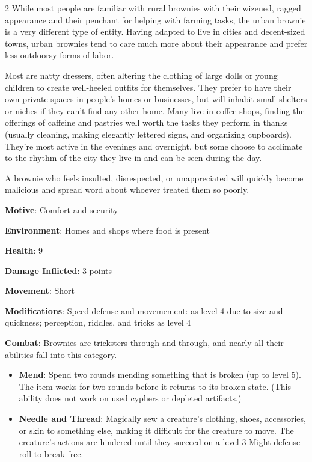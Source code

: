 \begin{multicols}{2}
While most people are familiar with rural brownies with their wizened, ragged appearance and their penchant for helping with farming tasks, the urban brownie is a very different type of entity. Having adapted to live in cities and decent-sized towns, urban brownies tend to care much more about their appearance and prefer less outdoorsy forms of labor. 

Most are natty dressers, often altering the clothing of large dolls or young children to create well-heeled outfits for themselves. They prefer to have their own private spaces in people’s homes or businesses, but will inhabit small shelters or niches if they can’t find any other home. Many live in coffee shops, finding the offerings of caffeine and pastries well worth the tasks they perform in thanks (usually cleaning, making elegantly lettered signs, and organizing cupboards). They’re most active in the evenings and overnight, but some choose to acclimate to the rhythm of the city they live in and can be seen during the day. 

A brownie who feels insulted, disrespected, or unappreciated will quickly become malicious and spread word about whoever treated them so poorly.

\textbf{Motive}: Comfort and security 

\textbf{Environment}: Homes and shops where food is present 

\textbf{Health}: 9 

\textbf{Damage Inflicted}: 3 points 

\textbf{Movement}: Short 

\textbf{Modifications}: Speed defense and movemement: as level 4 due to size and quickness; perception, riddles, and tricks as level 4 

\textbf{Combat}: Brownies are tricksters through and through, and nearly all their abilities fall into this category. 

\begin{itemize}
\item \textbf{Mend}: Spend two rounds mending something that is broken (up to level 5). The item works for two rounds before it returns to its broken state. (This ability does not work on used cyphers or depleted artifacts.) 

\item \textbf{Needle and Thread}: Magically sew a creature’s clothing, shoes, accessories, or skin to something else, making it difficult for the creature to move. The creature’s actions are hindered until they succeed on a level 3 Might defense roll to break free. 


\end{itemize}
\end{multicols}
